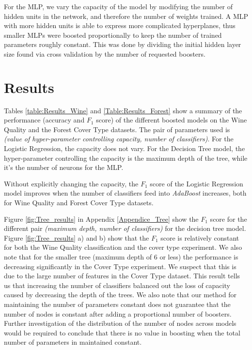 \documentclass{article}
\begin{document}
For the MLP, we vary the capacity of the model by modifying the number of hidden units in the network, and therefore the number of weights trained. A MLP with more hidden units is able to express more complicated hyperplanes, thus smaller MLPs were boosted proportionally to keep the number of trained parameters roughly constant. This was done by dividing the initial hidden layer size found via cross validation by the number of requested boosters.

\section{Results}
Tables \ref{table:Results_Wine} and \ref{Table:Results_Forest} show a summary of the performance (accuracy and $F_1$ score) of the different boosted models on the Wine Quality and the Forest Cover Type datasets. The pair of parameters used is \textit{(value of hyper-parameter controlling capacity, number of classifiers)}. For the Logistic Regression, the capacity does not vary. For the Decision Tree model, the hyper-parameter controlling the capacity is the maximum depth of the tree, while it's the number of neurons for the MLP. 

Without explicitly changing the capacity, the $F_1$ score of the Logistic Regression model improves when the number of classifiers feed into \textit{AdaBoost} increases, both for Wine Quality and Forest Cover Type datasets.

 Figure \ref{fig:Tree_results} in Appendix \ref{Appendice_Tree} show the $F_1$ score for the different pair \emph{(maximum depth, number of classifiers)} for the decision tree model. Figure \ref{fig:Tree_results} a) and b) show that the $F_1$ score is relatively constant for both the Wine Quality classification and the cover type experiment. We also note that for the smaller tree (maximum depth of 6 or less) the performance is decreasing significantly in the Cover Type experiment. We suspect that this is due to the large number of features in the Cover Type dataset. This result tells us that increasing the number of classifiers balanced out the loss of capacity caused by decreasing the depth of the trees. We also note that our method for maintaining the number of parameters constant does not guarantee that the number of nodes is constant after adding a proportional number of boosters. Further investigation of the distribution of the number of nodes across models would be required to conclude that there is no value in boosting when the total number of parameters in maintained constant.
\end{document}

